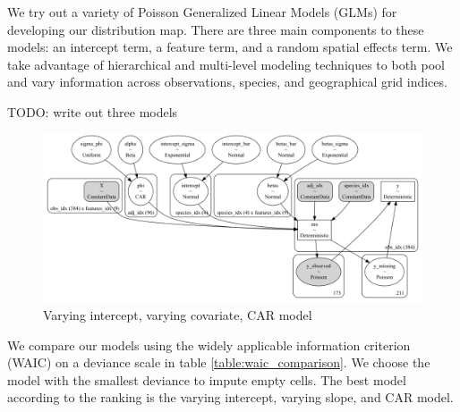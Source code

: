 \documentclass[notitlepage]{article}
\begin{document}
We try out a variety of Poisson Generalized Linear Models (GLMs) for developing our distribution map.
There are three main components to these models: an intercept term, a feature term, and a random spatial effects term.
We take advantage of hierarchical and multi-level modeling techniques to both pool and vary information across observations, species, and geographical grid indices.

TODO: write out three models

\begin{figure}[H]
\centering
\includegraphics[width=\textwidth]{report/figures/full_model.png}
\caption{Varying intercept, varying covariate, CAR model}
\end{figure}

We compare our models using the widely applicable information criterion (WAIC) on a deviance scale in table \ref{table:waic_comparison}.
We choose the model with the smallest deviance to impute empty cells.
The best model according to the ranking is the varying intercept, varying slope, and CAR model.
\end{document}
